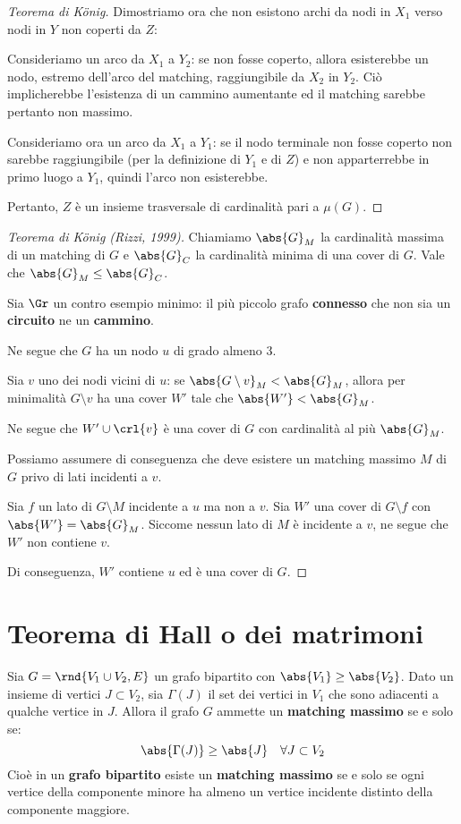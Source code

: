 \documentclass[\main/main.tex]{subfiles}
\begin{document}
\begin{proof}[Teorema di König]
	Dimostriamo ora che non esistono archi da nodi in \(X_1\) verso nodi in \(Y\) non coperti da \(Z\):

	Consideriamo un arco da \(X_1\) a \(Y_2\): se non fosse coperto, allora esisterebbe un nodo, estremo dell'arco del matching, raggiungibile da \(X_2\) in \(Y_2\). Ciò implicherebbe l'esistenza di un cammino aumentante ed il matching sarebbe pertanto non massimo.

	Consideriamo ora un arco da \(X_1\) a \(Y_1\): se il nodo terminale non fosse coperto non sarebbe raggiungibile (per la definizione di \(Y_1\) e di \(Z\)) e non apparterrebbe in primo luogo a \(Y_1\), quindi l'arco non esisterebbe.

	Pertanto, \(Z\) è un insieme trasversale di cardinalità pari a \(\mu(G)\).
\end{proof}

\begin{proof}[Teorema di König (Rizzi, 1999)]
	Chiamiamo \(\abs{G}_M\) la cardinalità massima di un matching di \(G\) e \(\abs{G}_C\) la cardinalità minima di una cover di \(G\). Vale che \(\abs{G}_M \leq \abs{G}_C\).

	Sia \(\Gr \) un contro esempio minimo: il più piccolo grafo \textbf{connesso} che non sia un \textbf{circuito} ne un \textbf{cammino}.

	Ne segue che \(G\) ha un nodo \(u\) di grado almeno \(3\).

	Sia \(v\) uno dei nodi vicini di \(u\): se \(\abs{G\setminus v}_M < \abs{G}_M\), allora per minimalità \(G \setminus v\) ha una cover \(W'\) tale che \(\abs{W'} < \abs{G}_M\).

	Ne segue che \(W' \cup \crl{v}\) è una cover di \(G\) con cardinalità al più \(\abs{G}_M\).

	Possiamo assumere di conseguenza che deve esistere un matching massimo \(M\) di \(G\) privo di lati incidenti a \(v\).

	Sia \(f\) un lato di \(G\setminus M\) incidente a \(u\) ma non a \(v\). Sia \(W'\) una cover di \(G\setminus f\) con \(\abs{W'} = \abs{G}_M\). Siccome nessun lato di \(M\) è incidente a \(v\), ne segue che \(W'\) non contiene \(v\).

	Di conseguenza, \(W'\) contiene \(u\) ed è una cover di \(G\).
\end{proof}
\clearpage
\section{Teorema di Hall o dei matrimoni}
\begin{theorem}
	Sia \(G = \rnd{V_1 \cup V_2, E}\) un grafo bipartito con \(\abs{V_1} \geq \abs{V_2}\). Dato un insieme di vertici \(J \subset V_2\), sia \(\Gamma(J) \) il set dei vertici in \(V_1\) che sono adiacenti a qualche vertice in \(J\). Allora il grafo \(G\) ammette un \textbf{matching massimo} se e solo se:
	\[
		\abs{\Gamma(J)} \geq \abs{J} \quad \forall J \subset V_2
	\]
	Cioè in un \textbf{grafo bipartito} esiste un \textbf{matching massimo} se e solo se ogni vertice della componente minore ha almeno un vertice incidente distinto della componente maggiore.
\end{theorem}
\end{document}
